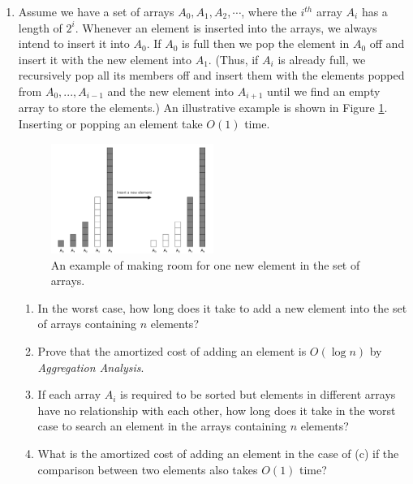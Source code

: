 \documentclass[12pt,a4paper]{article}
\theoremstyle{definition}
\begin{document}
\begin{enumerate}
	\item Assume we have a set of arrays $A_0, A_1, A_2,\cdots$, where the $i^{th}$ array $A_i$ has a length of $2^i$. Whenever an element is inserted into the arrays, we always intend to insert it into $A_0$. If $A_0$ is full then we pop the element in $A_0$ off and insert it with the new element into $A_{1}$. (Thus, if $A_{i}$ is already full, we recursively pop all its members off and insert them with the elements popped from $A_0,...,A_{i-1}$ and the new element into $A_{i+1}$ until we find an empty array to store the elements.) An illustrative example is shown in Figure \ref{Fig-MultiArray}. Inserting or popping an element take $O(1)$ time.

	\begin{figure}[!htbp]
	\centering
	\includegraphics[width=0.5\textwidth]{Fig-MultiArray.pdf}
	\caption{An example of making room for one new element in the set of arrays.}
	\label{Fig-MultiArray}
	\end{figure}

    \begin{enumerate}
        \item In the worst case, how long does it take to add a new element into the set of arrays containing $n$ elements?
        \item Prove that the amortized cost of adding an element is $O(\log n)$ by \emph{Aggregation Analysis}.
        \item If each array $A_i$ is required to be sorted but elements in different arrays have no relationship with each other, how long does it take in the worst case to search an element in the arrays containing $n$ elements? 
\item What is the amortized cost of adding an element in the case of (c) if the comparison between two elements also takes $O(1)$ time?
    \end{enumerate}


\end{enumerate}
\end{document}
